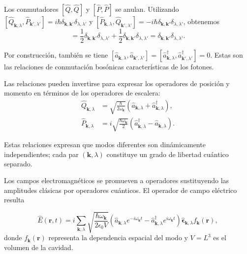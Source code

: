         Los conmutadores $[\hat{Q}, \hat{Q}]$ y $[\hat{P}, \hat{P}]$ se anulan. Utilizando $[\hat{Q}_{\mathbf{k},\lambda}, \hat{P}_{\mathbf{k}',\lambda'}] = i\hbar\delta_{\mathbf{k},\mathbf{k}'}\delta_{\lambda,\lambda'}$ y $[\hat{P}_{\mathbf{k},\lambda}, \hat{Q}_{\mathbf{k}',\lambda'}] = -i\hbar\delta_{\mathbf{k},\mathbf{k}'}\delta_{\lambda,\lambda'}$, obtenemos
        \begin{equation}
            [\hat{a}_{\mathbf{k},\lambda}, \hat{a}^\dagger_{\mathbf{k}',\lambda'}] = \frac{1}{2}\delta_{\mathbf{k},\mathbf{k}'}\delta_{\lambda,\lambda'} + \frac{1}{2}\delta_{\mathbf{k},\mathbf{k}'}\delta_{\lambda,\lambda'} = \delta_{\mathbf{k},\mathbf{k}'}\delta_{\lambda,\lambda'}.
        \end{equation}
        
        Por construcción, también se tiene $[\hat{a}_{\mathbf{k},\lambda}, \hat{a}_{\mathbf{k}',\lambda'}] = [\hat{a}^\dagger_{\mathbf{k},\lambda}, \hat{a}^\dagger_{\mathbf{k}',\lambda'}] = 0$. Estas son las relaciones de conmutación bosónicas características de los fotones.
        
        Las relaciones pueden invertirse para expresar los operadores de posición y momento en términos de los operadores de escalera:
        \begin{align}
            \hat{Q}_{\mathbf{k},\lambda} &= \sqrt{\frac{\hbar}{2\omega_{\mathbf{k}}}}\left(\hat{a}_{\mathbf{k},\lambda} + \hat{a}^\dagger_{\mathbf{k},\lambda}\right), \\
            \hat{P}_{\mathbf{k},\lambda} &= i\sqrt{\frac{\hbar\omega_{\mathbf{k}}}{2}}\left(\hat{a}^\dagger_{\mathbf{k},\lambda} - \hat{a}_{\mathbf{k},\lambda}\right).
        \end{align}
 
        Estas relaciones expresan que modos diferentes son dinámicamente independientes; cada par $(\mathbf{k}, \lambda)$ constituye un grado de libertad cuántico separado.

        Los campos electromagnéticos se promueven a operadores sustituyendo las amplitudes clásicas por operadores cuánticos. El operador de campo eléctrico resulta

        \begin{equation}
            \hat{E}(\mathbf{r}, t) = i\sum_{\mathbf{k},\lambda} \sqrt{\frac{\hbar\omega_{\mathbf{k}}}{2\epsilon_0 V}} \left(\hat{a}_{\mathbf{k},\lambda} e^{-i\omega_{\mathbf{k}} t} - \hat{a}^\dagger_{\mathbf{k},\lambda} e^{i\omega_{\mathbf{k}} t}\right) \hat{\boldsymbol{\epsilon}}_{\mathbf{k},\lambda} f_{\mathbf{k}}(\mathbf{r}),
        \end{equation}
        donde $f_{\mathbf{k}}(\mathbf{r})$ representa la dependencia espacial del modo y $V = L^3$ es el volumen de la cavidad.
        
